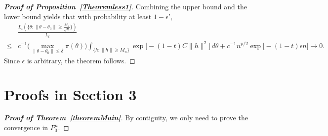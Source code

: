 \documentclass[3p]{elsarticle}
\theoremstyle{plain}
\theoremstyle{definition}
\theoremstyle{remark}
\begin{document}
\begin{appendices}
\begin{proof}[\textbf{Proof of Proposition~\ref{Theoremless1}}]
     Combining the upper bound and the lower bound yields that with probability at least $1-\epsilon'$,
     $$
     \begin{aligned}
         &
       \frac{L_{t} ( \{\theta: \|\theta-\theta_0\|\geq \frac{M_n}{\sqrt{n}}\})}{L_{t}}
          \\
          \leq&
         c^{-1}\big(\max_{\|\theta-\theta_0\|\leq \delta} \pi(\theta)\big)
         \int_{\big\{h:\|h\|\geq M_n\big\}}\exp\big[-(1-t)C \|h\|^2\big]\, d\theta
        +
         c^{-1}n^{p/2} \exp\big[-(1-t)\epsilon n\big]
         \to 0.
     \end{aligned}
     $$
    Since $\epsilon $ is arbitrary, the theorem follows.
\end{proof}


\section{Proofs in Section 3}

\begin{proof}[\textbf{Proof of Theorem~\ref{theoremMain}}]
    By contiguity, we only need to prove the convergence in $P_0^n$.


\end{proof}
\end{appendices}
\end{document}
